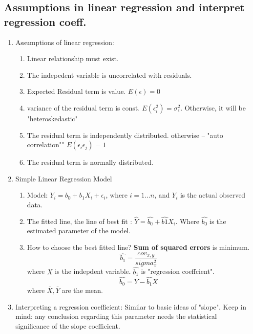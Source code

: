 \documentclass{article}
\begin{document}
\subsection{Assumptions in linear regression and interpret regression coeff.}
\begin{enumerate}
    \item Assumptions of linear regression:
        \begin{enumerate}
            \item Linear relationship must exist.
            \item The indepedent variable is uncorrelated with residuals.
            \item Expected Residual term is value. $E(\epsilon)=0$
            \item variance of the residual term is const. $E(\epsilon_i^2)=
                \sigma_\epsilon^2$. Otherwise, it will be "heteroskedastic"
            \item The residual term is independently distributed. otherwise -- "auto correlation"" 
                $E(\epsilon_i\epsilon_j)=1$    
            \item The residual term is normally distributed.
        \end{enumerate}
    \item Simple Linear Regression Model
        \begin{enumerate}
            \item Model: $Y_i=b_0+b_1X_i+\epsilon_i$, where $i=1...n$, and $Y_i$ is 
     the actual observed data.
            \item The fitted line, the line of best fit
                : $\hat{Y}=\hat{b_0}+\hat{b1}X_i$. Where $\hat{b_0}$
                is the estimated parameter of the model.
            \item How to choose the best fitted line? {\bf Sum of squared errors}
                 is minimum.
                 $$
                    \hat{b_1} = \frac{cov_{x,y}}{sigma_x^2}
                 $$
                 where $X$ is the indepdent variable. $\hat{b_1}$ is 
                 "regression coeffcient".
                 $$
                    \hat{b_0} = \bar Y - \hat{b_1}\bar X
                 $$
                 where $\bar X, \bar Y$ are the mean.
        \end{enumerate}
    \item Interpreting a regression coefficient: Similar to basic ideas of 
        "slope". Keep in mind: any conclusion regarding this parameter needs 
        the statistical significance of the slope coefficient.
\end{enumerate}
\end{document}
